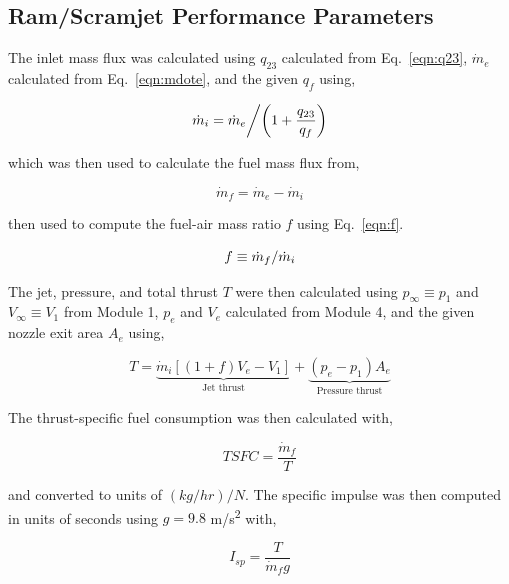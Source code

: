 \documentclass[conf]{new-aiaa} %
\begin{document}
\subsection{Ram/Scramjet Performance Parameters}
The inlet mass flux was calculated using $q_{23}$ calculated from Eq.~\eqref{eqn:q23}, $\dot{m}_e$ calculated from Eq.~\eqref{eqn:mdote}, and the given $q_f$ using,

\begin{equation}
    \label{eqn:mdoti}
    \left. \dot{m}_i=\dot{m}_e \middle/ \left(1+\frac{q_{23}}{q_f}\right) \right.
\end{equation}

which was then used to calculate the fuel mass flux from,

\begin{equation}
    \label{eqn:mdotf}
    \dot{m}_f=\dot{m}_e-\dot{m}_i
\end{equation}

then used to compute the fuel-air mass ratio $f$ using Eq.~\eqref{eqn:f}.

\begin{equation}
    \label{eqn:f}
    \left. f\equiv\dot{m}_f\middle/\dot{m}_i \right.
\end{equation}

The jet, pressure, and total thrust $T$ were then calculated using $p_\infty\equiv p_1$ and $V_\infty\equiv V_1$ from Module 1, $p_e$ and $V_e$ calculated from Module 4, and the given nozzle exit area $A_e$ using,

\begin{equation}
    \label{eqn:Thrust}
    T=
    \underbrace{\dot{m}_i\left[\left(1+f\right)V_e-V_1\right]}_\text{Jet thrust}
    +
    \underbrace{\left(p_e-p_1\right)A_e}_\text{Pressure thrust}
\end{equation}

The thrust-specific fuel consumption was then calculated with,

\begin{equation}
    \label{eqn:TSFC}
    TSFC=\frac{\dot{m}_f}{T}
\end{equation}

and converted to units of $(kg/hr)/N$. The specific impulse was then computed in units of seconds using $g=9.8$ m/s\textsuperscript{2} with,

\begin{equation}
    \label{eqn:Isp}
    I_{sp}=\frac{T}{\dot{m}_f g}
\end{equation}
\end{document}
